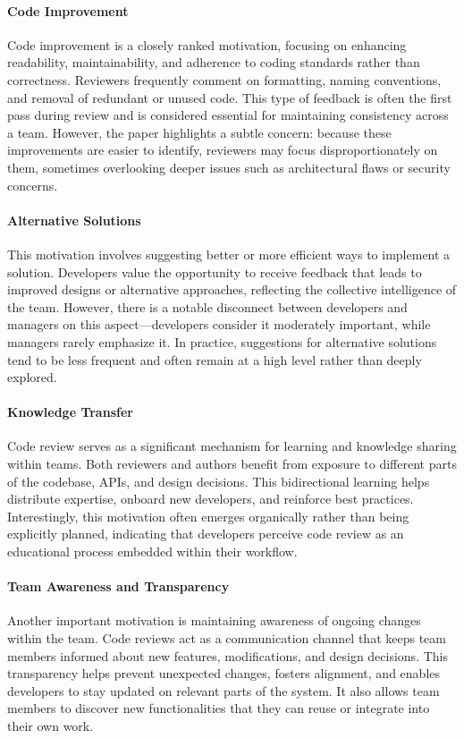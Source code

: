 \paragraph{Code Improvement}
Code improvement is a closely ranked motivation, focusing on enhancing readability, maintainability, and adherence to coding standards rather than correctness. Reviewers frequently comment on formatting, naming conventions, and removal of redundant or unused code. This type of feedback is often the first pass during review and is considered essential for maintaining consistency across a team. However, the paper highlights a subtle concern: because these improvements are easier to identify, reviewers may focus disproportionately on them, sometimes overlooking deeper issues such as architectural flaws or security concerns.

\paragraph{Alternative Solutions}
This motivation involves suggesting better or more efficient ways to implement a solution. Developers value the opportunity to receive feedback that leads to improved designs or alternative approaches, reflecting the collective intelligence of the team. However, there is a notable disconnect between developers and managers on this aspect—developers consider it moderately important, while managers rarely emphasize it. In practice, suggestions for alternative solutions tend to be less frequent and often remain at a high level rather than deeply explored.

\paragraph{Knowledge Transfer}
Code review serves as a significant mechanism for learning and knowledge sharing within teams. Both reviewers and authors benefit from exposure to different parts of the codebase, APIs, and design decisions. This bidirectional learning helps distribute expertise, onboard new developers, and reinforce best practices. Interestingly, this motivation often emerges organically rather than being explicitly planned, indicating that developers perceive code review as an educational process embedded within their workflow.

\paragraph{Team Awareness and Transparency}
Another important motivation is maintaining awareness of ongoing changes within the team. Code reviews act as a communication channel that keeps team members informed about new features, modifications, and design decisions. This transparency helps prevent unexpected changes, fosters alignment, and enables developers to stay updated on relevant parts of the system. It also allows team members to discover new functionalities that they can reuse or integrate into their own work.

